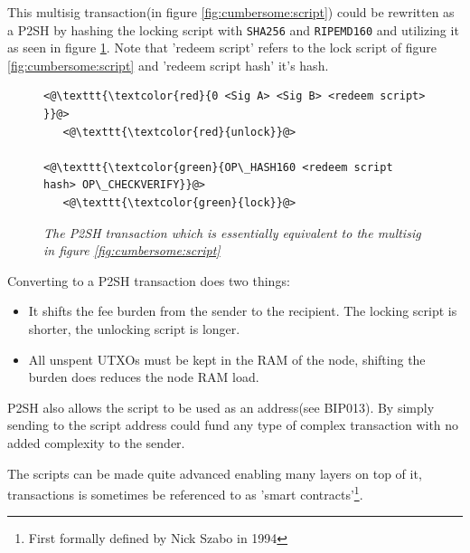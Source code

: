 This multisig transaction(in figure \ref{fig:cumbersome:script}) could be rewritten as a P2SH by hashing the locking script with \texttt{SHA256} and  \texttt{RIPEMD160} and utilizing it as seen in figure \ref{fig:p2sh}. Note that 'redeem script' refers to the lock script of figure \ref{fig:cumbersome:script} and 'redeem script hash' it's hash.

\begin{figure}[hbt!]
	
	\begin{lstlisting}
<@\texttt{\textcolor{red}{0 <Sig A> <Sig B> <redeem script> }}@>   
   <@\texttt{\textcolor{red}{unlock}}@>
	
<@\texttt{\textcolor{green}{OP\_HASH160 <redeem script hash> OP\_CHECKVERIFY}}@>
   <@\texttt{\textcolor{green}{lock}}@>
	\end{lstlisting}
	
	\caption{\textit{ The P2SH transaction which is essentially equivalent to the multisig in figure \ref{fig:cumbersome:script}
	}}
	\label{fig:p2sh}
\end{figure}

Converting to a P2SH transaction does two things:

\begin{itemize}

	\item It shifts the fee burden from the sender to the recipient. The locking script is shorter, the unlocking script is longer.
	
	\item All unspent UTXOs must be kept in the RAM of the node, shifting the burden does reduces the node RAM load. 
	
\end{itemize}

P2SH also allows the script to be used as an address(see BIP013\cite{bip:0013:p2shaddr}). By simply sending to the script address could fund any type of complex transaction with no added complexity to the sender.

The scripts can be made quite advanced enabling many layers on top of it, transactions is sometimes be referenced to as 'smart contracts'\footnote{First formally defined by Nick Szabo in 1994\cite{szabo:smart:contracts}}.

